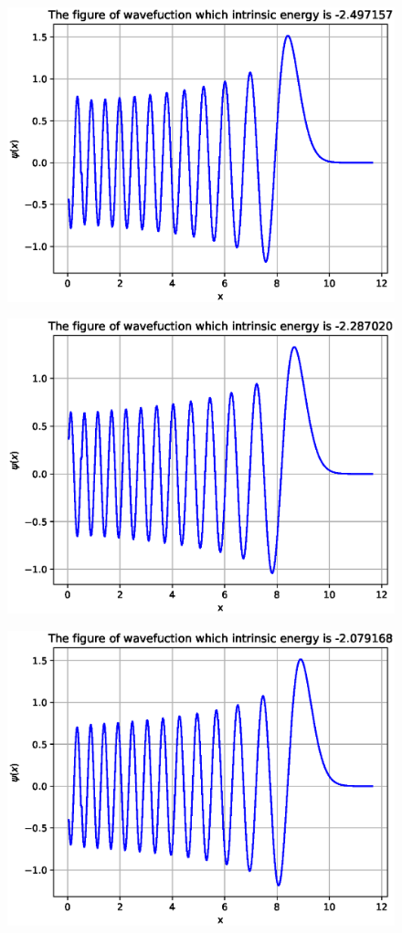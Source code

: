 \documentclass[twoside,twocolumn]{article}
\begin{document}
\begin{CJK*}{UTF8}{gkai}
\begin{figure}
	\label{fig:22}
\end{figure}
\begin{figure}
	\centering
	\includegraphics[width=0.9\linewidth]{figure/23}
	\label{fig:23}
\end{figure}
\begin{figure}
	\centering
	\includegraphics[width=0.9\linewidth]{figure/24}
	\label{fig:24}
\end{figure}
\begin{figure}
	\centering
	\includegraphics[width=0.9\linewidth]{figure/25}

\end{figure}
\end{CJK*}
\end{document}
